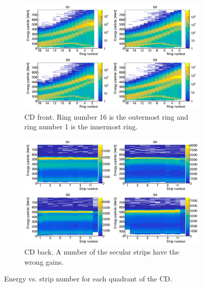 \documentclass[twoside,english]{uiofysmaster/uiofysmaster}
\begin{document}
\begin{figure}[ht]
	\centering
	\begin{subfigure}{\textwidth}
		\centering
		\includegraphics[width=\textwidth]{../Plots/plotting/E_vs_f-strip_all_Q.png}
		\caption{CD front. Ring number 16 is the outermost ring and ring number 1 is the innermost ring.}
		\label{fig:cal_CD_front}
	\end{subfigure}
	\begin{subfigure}{\textwidth}
		\centering
		\includegraphics[width=\textwidth]{../Plots/plotting/E_vs_b-strip_all_Q.png}
		\caption{CD back. A number of the secular strips have the wrong gains.}
		\label{fig:cal_CD_back}
	\end{subfigure}
	\caption{Energy vs. strip number for each quadrant of the CD.}
	\label{fig:cal_CD}
\end{figure}
\end{document}
